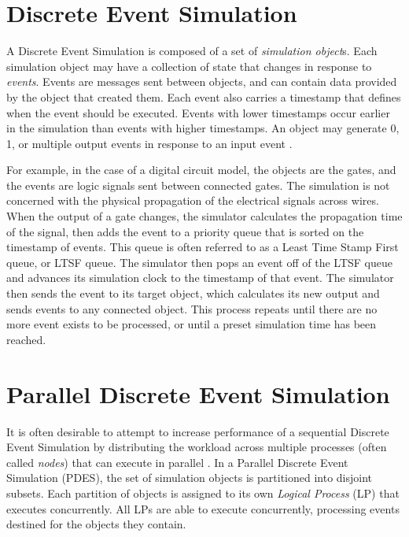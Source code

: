 \documentclass[11pt]{book}
\begin{document}
\section{Discrete Event Simulation}

A Discrete Event Simulation is composed of a set of \emph{simulation object}s. Each simulation object may have a collection of state that changes in response to \emph{events}. Events are messages sent between objects, and can contain data provided by the object that created them. Each event also carries a timestamp that defines when the event should be executed. Events with lower timestamps occur earlier in the simulation than events with higher timestamps. An object may generate 0, 1, or multiple output events in response to an input event \cite{law-00}.

For example, in the case of a digital circuit model, the objects are the gates, and the events are logic signals sent between connected gates. The simulation is not concerned with the physical propagation of the electrical signals across wires. When the output of a gate changes, the simulator calculates the propagation time of the signal, then adds the event to a priority queue that is sorted on the timestamp of events. This queue is often referred to as a Least Time Stamp First queue, or LTSF queue. The simulator then pops an event off of the LTSF queue and advances its simulation clock to the timestamp of that event. The simulator then sends the event to its target object, which calculates its new output and sends events to any connected object. This process repeats until there are no more event exists to be processed, or until a preset simulation time has been reached.

\section{Parallel Discrete Event Simulation}

It is often desirable to attempt to increase performance of a sequential Discrete Event Simulation by distributing the workload across multiple processes (often called \emph{nodes}) that can execute in parallel \cite{fujimoto-90}. In a Parallel Discrete Event Simulation (PDES), the set of simulation objects is partitioned into disjoint subsets. Each partition of objects is assigned to its own \emph{Logical Process} (LP) that executes concurrently. All LPs are able to execute concurrently, processing events destined for the objects they contain.
\end{document}
